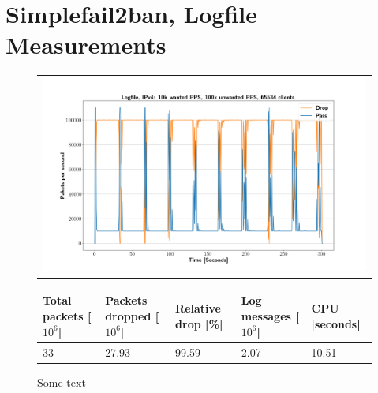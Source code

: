 \section{Simplefail2ban, Logfile Measurements}

\begin{figure}[p]
	\label{fig:simplefail2ban:disk:ip4:100k}
	\centering
	\scriptsize
	\begin{tabular}{c}
    	\centerline{\includegraphics[width=1.2\textwidth]{images/simplefail2ban_disk_ipv4_v10k_iv100k_c65534.png}}
	\end{tabular}
	\begin{tabular}{lllll}
		\toprule
		\textbf{Total packets [$10^6$]} & \textbf{Packets dropped [$10^6$]} & \textbf{Relative drop [\%]} & \textbf{Log messages [$10^6$]} & \textbf{CPU [seconds]} \\ \midrule 
		33 & 27.93 & 99.59 & 2.07 & 10.51 \\
		\bottomrule
	\end{tabular}
	\caption[Simplefail2ban, Logfile IPv4, 100k \ac{PPS}]{Some text}
\end{figure}

